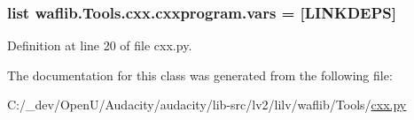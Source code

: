 \subsubsection[{\texorpdfstring{vars}{vars}}]{\setlength{\rightskip}{0pt plus 5cm}list waflib.\+Tools.\+cxx.\+cxxprogram.\+vars = \mbox{[}\textquotesingle{}L\+I\+N\+K\+D\+E\+PS\textquotesingle{}\mbox{]}\hspace{0.3cm}{\ttfamily [static]}}\hypertarget{classwaflib_1_1_tools_1_1cxx_1_1cxxprogram_a151587343ba3422c015c899a39427f6a}{}\label{classwaflib_1_1_tools_1_1cxx_1_1cxxprogram_a151587343ba3422c015c899a39427f6a}


Definition at line 20 of file cxx.\+py.



The documentation for this class was generated from the following file\+:\begin{DoxyCompactItemize}
\item 
C\+:/\+\_\+dev/\+Open\+U/\+Audacity/audacity/lib-\/src/lv2/lilv/waflib/\+Tools/\hyperlink{lilv_2waflib_2_tools_2cxx_8py}{cxx.\+py}\end{DoxyCompactItemize}
